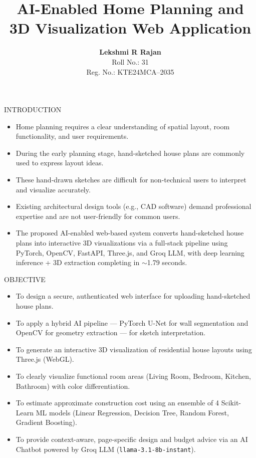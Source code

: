 \documentclass[aspectratio=169]{beamer}
\title{AI-Enabled Home Planning and 3D Visualization Web Application}
\author[Lekshmi R Rajan | Roll No.: 31]{
\textbf{Lekshmi R Rajan}\\
Roll No.: 31\\
Reg. No.: KTE24MCA--2035
}
\institute{
\textbf{Guided By:}\\
Prof. Shilpa M Thomas\\[0.2cm]
Department of Computer Applications\\
Rajiv Gandhi Institute of Technology (RIT), Kottayam
}
\date{}
\begin{document}
\begin{frame}
\titlepage
\end{frame}

\begin{frame}{INTRODUCTION}
\begin{itemize}
  \item Home planning requires a clear understanding of spatial layout, room functionality, and user requirements.
  \item During the early planning stage, hand-sketched house plans are commonly used to express layout ideas.
  \item These hand-drawn sketches are difficult for non-technical users to interpret and visualize accurately.
  \item Existing architectural design tools (e.g., CAD software) demand professional expertise and are not user-friendly for common users.
  \item The proposed AI-enabled web-based system converts hand-sketched house plans into interactive 3D visualizations via a full-stack pipeline using PyTorch, OpenCV, FastAPI, Three.js, and Groq LLM, with deep learning inference + 3D extraction completing in $\sim$1.79 seconds.
\end{itemize}
\end{frame}

\begin{frame}{OBJECTIVE}
\begin{itemize}
  \item To design a secure, authenticated web interface for uploading hand-sketched house plans.
  \item To apply a hybrid AI pipeline — PyTorch U-Net for wall segmentation and OpenCV for geometry extraction — for sketch interpretation.
  \item To generate an interactive 3D visualization of residential house layouts using Three.js (WebGL).
  \item To clearly visualize functional room areas (Living Room, Bedroom, Kitchen, Bathroom) with color differentiation.
  \item To estimate approximate construction cost using an ensemble of 4 Scikit-Learn ML models (Linear Regression, Decision Tree, Random Forest, Gradient Boosting).
  \item To provide context-aware, page-specific design and budget advice via an AI Chatbot powered by Groq LLM (\texttt{llama-3.1-8b-instant}).
\end{itemize}
\end{frame}
\end{document}
